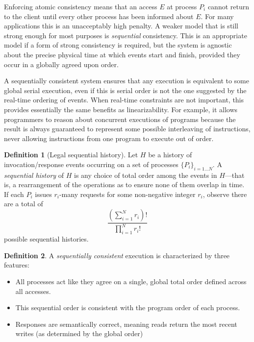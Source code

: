 \documentclass[]             %
{NASA}                       %
\theoremstyle{definition}
\newtheorem{definition}{Definition}[section]
\begin{document}
Enforcing atomic consistency means that an access \(E\) at process
\(P_i\) cannot return to the client until every other process has been
informed about \(E\). For many applications this is an unacceptably
high penalty. A weaker model that is still strong enough for most
purposes is \emph{sequential} consistency. This is an appropriate
model if a form of strong consistency is required, but the system is
agnostic about the precise physical time at which events start and
finish, provided they occur in a globally agreed upon order.

A sequentially consistent system ensures that any execution is
equivalent to some global serial execution, even if this is serial order
is not the one suggested by the real-time ordering of events. When
real-time constraints are not important, this provides essentially the
same benefits as linearizability. For example, it allows programmers to
reason about concurrent executions of programs because the result is
always guaranteed to represent some possible interleaving of
instructions, never allowing instructions from one program to execute
out of order.

\begin{definition}[Legal sequential history]
Let $H$ be a history of invocation/response events occurring on a set
of processes $\{P_i\}_{i = 1 \ldots N}$. A \emph{sequential history}
of $H$ is any choice of total order among the events in $H$---that is,
a rearrangement of the operations as to ensure none of them overlap in
time. If each $P_i$ issues
$r_i$-many requests for some non-negative integer $r_i$, observe there
are a total of
\[
\frac{\left(\sum_{i = 1}^N r_i\right)!}{\prod_{i = 1}^N r_i!}
\]
possible sequential histories.
\end{definition}

\begin{definition}
  \label{def:sequentiallyconsistent}
  A \emph{sequentially consistent} execution is
  characterized by three features:
  \begin{itemize}
  \item All processes act like they agree on a single, global total order
    defined across all accesses.
  \item This sequential order is consistent with the program order of each process.
  \item Responses are semantically correct, meaning reads return the most recent writes (as determined by the global order)
  \end{itemize}
\end{definition}
\end{document}
